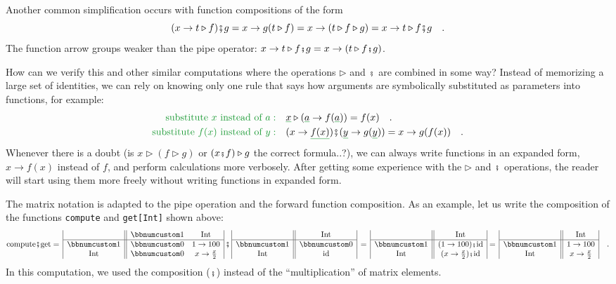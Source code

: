 Another common simplification occurs with function compositions of
the form
\[
(x\rightarrow t\triangleright f)\bef g=x\rightarrow g(t\triangleright f)=x\rightarrow(t\triangleright f\triangleright g)=x\rightarrow t\triangleright f\bef g\quad.
\]
The function arrow groups weaker than the pipe operator: $x\rightarrow t\triangleright f\bef g=x\rightarrow(t\triangleright f\bef g)$.

How can we verify this and other similar computations where the operations
$\triangleright$ and $\bef$ are combined in some way? Instead of
memorizing a large set of identities, we can rely on knowing only
one rule that says how arguments are symbolically substituted as parameters
into functions, for example:
\begin{align*}
{\color{greenunder}\text{substitute }x\text{ instead of }a:}\quad & \gunderline x\triangleright(\gunderline a\rightarrow f(\gunderline a))=f(x)\quad.\\
{\color{greenunder}\text{substitute }f(x)\text{ instead of }y:}\quad & (x\rightarrow\gunderline{f(x)})\bef(\gunderline y\rightarrow g(\gunderline y))=x\rightarrow g(f(x))\quad.
\end{align*}
Whenever there is a doubt (is $x\triangleright(f\triangleright g)$
or $(x\bef f)\triangleright g$ the correct formula..?), we can always
write functions in an expanded form, $x\rightarrow f(x)$ instead
of $f$, and perform calculations more verbosely. After getting some
experience with the $\triangleright$ and $\bef$ operations, the
reader will start using them more freely without writing functions
in expanded form.

The matrix notation is adapted to the pipe operation and the forward
function composition. As an example, let us write the composition
of the functions \lstinline!compute! and \lstinline!get[Int]! shown
above: 
\[
\text{compute}\bef\text{get}=\,\begin{array}{|c||cc|}
 & \bbnum 1 & \text{Int}\\
\hline \bbnum 1 & \bbnum 0 & 1\rightarrow100\\
\text{Int} & \bbnum 0 & x\rightarrow\frac{x}{2}
\end{array}\,\bef\,\begin{array}{|c||c|}
 & \text{Int}\\
\hline \bbnum 1 & \bbnum 0\\
\text{Int} & \text{id}
\end{array}\,=\,\begin{array}{|c||c|}
 & \text{Int}\\
\hline \bbnum 1 & (1\rightarrow100)\bef\text{id}\\
\text{Int} & (x\rightarrow\frac{x}{2})\bef\text{id}
\end{array}=\,\begin{array}{|c||c|}
 & \text{Int}\\
\hline \bbnum 1 & 1\rightarrow100\\
\text{Int} & x\rightarrow\frac{x}{2}
\end{array}\quad.
\]
In this computation, we used the composition ($\bef$) instead of
the \textsf{``}multiplication\textsf{''} of matrix elements.

